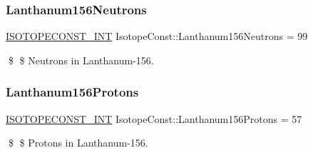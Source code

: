 \subsubsection{\texorpdfstring{Lanthanum156\+Neutrons}{Lanthanum156Neutrons}}
{\footnotesize\ttfamily \mbox{\hyperlink{group___isotope_const-_macros_ga5f18360b3e99483a35c32d789e62621c}{I\+S\+O\+T\+O\+P\+E\+C\+O\+N\+S\+T\+\_\+\+I\+NT}} Isotope\+Const\+::\+Lanthanum156\+Neutrons = 99}

\$ \$ Neutrons in Lanthanum-\/156. \mbox{\label{group___isotope_const-_lanthanum-_la156_ga2050811618a7c2782808d69376608865}} 
\subsubsection{\texorpdfstring{Lanthanum156\+Protons}{Lanthanum156Protons}}
{\footnotesize\ttfamily \mbox{\hyperlink{group___isotope_const-_macros_ga5f18360b3e99483a35c32d789e62621c}{I\+S\+O\+T\+O\+P\+E\+C\+O\+N\+S\+T\+\_\+\+I\+NT}} Isotope\+Const\+::\+Lanthanum156\+Protons = 57}

\$ \$ Protons in Lanthanum-\/156. 